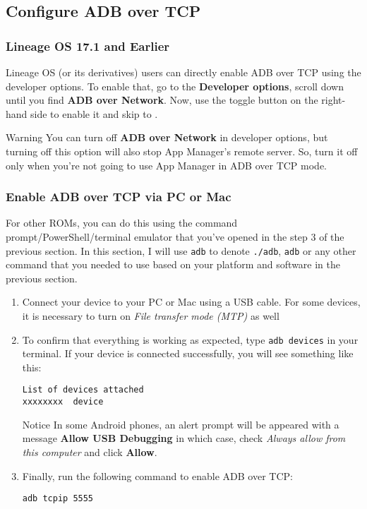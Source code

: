 \subsection{Configure ADB over TCP}\label{subsec:configure-adb-over-tcp} %

\subsubsection{Lineage OS 17.1 and Earlier}\label{subsubsec:lineage-os} %
Lineage OS (or its derivatives) users can directly enable ADB over TCP using the developer options. To enable that,
go to the \textbf{Developer options}, scroll down until you find \textbf{ADB over Network}. Now, use the toggle button
on the right-hand side to enable it and skip to .

\begin{warning}{Warning}
    You can turn off \textbf{ADB over Network} in developer options, but turning off this option will also stop App
    Manager's remote server. So, turn it off only when you're not going to use App Manager in ADB over TCP mode.
\end{warning}

\subsubsection{Enable ADB over TCP via PC or Mac}\label{subsubsec:enable-adb-over-tcp-via-pc-or-mac} %
For other ROMs, you can do this using the command prompt/PowerShell/terminal emulator that you've opened in the step 3
of the previous section. In this section, I will use \texttt{adb} to denote \texttt{./adb}, \texttt{adb} or any other
command that you needed to use based on your platform and software in the previous section.
\begin{enumerate}
    \item Connect your device to your PC or Mac using a USB cable. For some devices, it is necessary to turn on
    \textit{File transfer mode (MTP)} as well
    \item To confirm that everything is working as expected, type \texttt{adb devices} in your terminal. If your device
    is connected successfully, you will see something like this:
    \begin{Verbatim}
List of devices attached
xxxxxxxx  device
    \end{Verbatim}
    \begin{tip}{Notice}
        In some Android phones, an alert prompt will be appeared with a message \textbf{Allow USB Debugging}
        in which case, check \textit{Always allow from this computer} and click \textbf{Allow}.
    \end{tip}
    \item Finally, run the following command to enable ADB over TCP:
    \begin{verbatim}
adb tcpip 5555
    \end{verbatim}
\end{enumerate}

